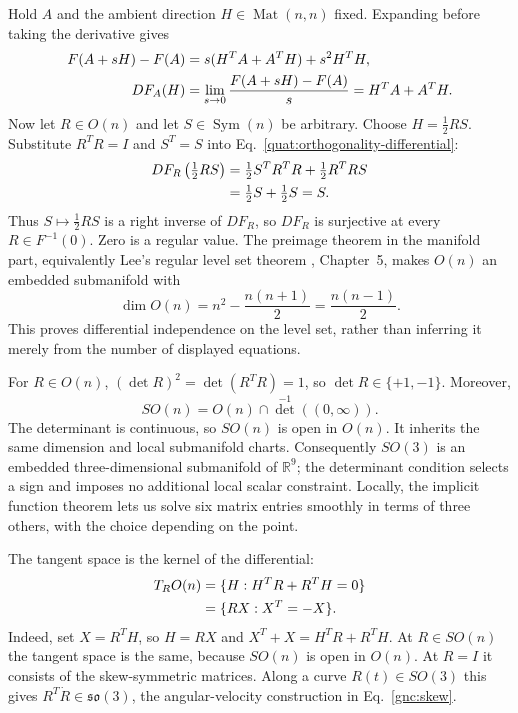 Hold $A$ and the ambient direction $H\in\operatorname{Mat}(n,n)$ fixed.
Expanding before taking the derivative gives
\begin{align}
 F(A+sH)-F(A)
 &=s(H^TA+A^TH)+s^2H^TH,\notag\\
 DF_A(H)
 &=\lim_{s\to0}\frac{F(A+sH)-F(A)}s
   =H^TA+A^TH.\label{quat:orthogonality-differential}
\end{align}
Now let $R\in O(n)$ and let $S\in\operatorname{Sym}(n)$ be arbitrary.
Choose $H=\tfrac12RS$. Substitute $R^TR=I$ and $S^T=S$ into
Eq.~\eqref{quat:orthogonality-differential}:
\begin{align}
 DF_R\left(\tfrac12RS\right)
 &=\tfrac12S^TR^TR+\tfrac12R^TRS\notag\\
 &=\tfrac12S+\tfrac12S=S.\label{quat:orthogonality-right-inverse}
\end{align}
Thus $S\mapsto\tfrac12RS$ is a right inverse of $DF_R$, so $DF_R$
is surjective at every $R\in F^{-1}(0)$. Zero is a regular value.
The preimage theorem in the manifold part, equivalently Lee's regular
level set theorem \cite{dgdt:JLee2012}, Chapter~5, makes $O(n)$ an embedded
submanifold with
\begin{equation}\label{quat:dim-On}
 \dim O(n)=n^2-\frac{n(n+1)}2=\frac{n(n-1)}2.
\end{equation}
This proves differential independence on the level set, rather than
inferring it merely from the number of displayed equations.

For $R\in O(n)$, $(\det R)^2=\det(R^TR)=1$, so $\det R\in\{+1,-1\}$.
Moreover,
\[
 SO(n)=O(n)\cap\det^{-1}((0,\infty)).
\]
The determinant is continuous, so $SO(n)$ is open in $O(n)$. It inherits
the same dimension and local submanifold charts. Consequently $SO(3)$ is
an embedded three-dimensional submanifold of $\mathbb R^9$; the determinant
condition selects a sign and imposes no additional local scalar constraint.
Locally, the implicit function theorem lets us solve six matrix entries
smoothly in terms of three others, with the choice depending on the point.

The tangent space is the kernel of the differential:
\begin{align}
 T_RO(n)
 &=\{H:H^TR+R^TH=0\}\notag\\
 &=\{RX:X^T=-X\}.\label{quat:orthogonal-tangent}
\end{align}
Indeed, set $X=R^TH$, so $H=RX$ and $X^T+X=H^TR+R^TH$.
At $R\in SO(n)$ the tangent space is the same, because $SO(n)$ is open
in $O(n)$. At $R=I$ it consists of the skew-symmetric matrices.
Along a curve $R(t)\in SO(3)$ this gives $R^T\dot R\in\mathfrak{so}(3)$,
the angular-velocity construction in Eq.~\eqref{gnc:skew}.

